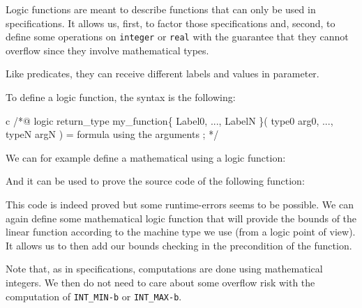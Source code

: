 Logic functions are meant to describe functions that can only be used in
specifications. It allows us, first, to factor those specifications and,
second, to define some operations on \texttt{integer} or \texttt{real}
with the guarantee that they cannot overflow since they involve mathematical
types.

Like predicates, they can receive different labels and values in
parameter.





To define a logic function, the syntax is the following:



\begin{CodeBlock}{c}
/*@
  logic return_type my_function\{ Label0, ..., LabelN \}( type0 arg0, ..., typeN argN ) =
    formula using the arguments ;
*/
\end{CodeBlock}



We can for example define a mathematical  using a logic function:






And it can be used to prove the source code of the following function:








This code is indeed proved but some runtime-errors seems to be possible.
We can again define some mathematical logic function that will provide the bounds of
the linear function according to the machine type we use (from a logic point of
view). It allows us to then add our bounds checking in the precondition of the
function.






\begin{Information}
  Note that, as in specifications, computations are done using mathematical
  integers. We then do not need to care about some overflow risk with the
  computation of \texttt{INT\_MIN-b} or \texttt{INT\_MAX-b}.
\end{Information}


